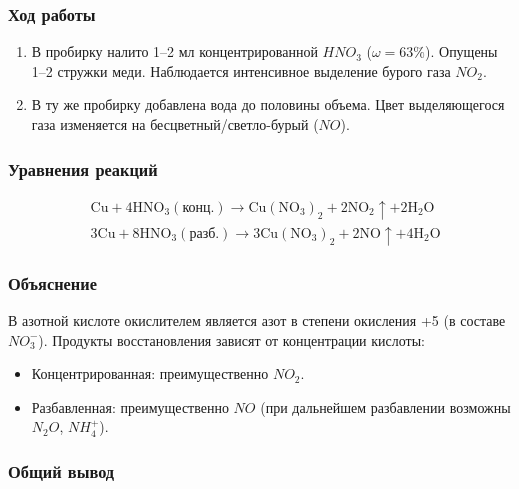 \documentclass[a4paper,12pt]{article}
\begin{document}
	\subsubsection*{Ход работы}
	\begin{enumerate}
		\item В пробирку налито 1–2 мл концентрированной \(HNO_3\) (\(\omega = 63\%\)). Опущены 1–2 стружки меди. Наблюдается интенсивное выделение бурого газа \(NO_2\).
		\item В ту же пробирку добавлена вода до половины объема. Цвет выделяющегося газа изменяется на бесцветный/светло-бурый (\(NO\)).
	\end{enumerate}
	
	\subsubsection*{Уравнения реакций}
	\begin{align*}
		& \text{Cu} + 4\text{HNO}_3 (\text{конц.}) \rightarrow \text{Cu}(\text{NO}_3)_2 + 2\text{NO}_2 \uparrow + 2\text{H}_2\text{O} \\
		& 3\text{Cu} + 8\text{HNO}_3 (\text{разб.}) \rightarrow 3\text{Cu}(\text{NO}_3)_2 + 2\text{NO} \uparrow + 4\text{H}_2\text{O}
	\end{align*}
	
	\subsubsection*{Объяснение}
	
	\quad В азотной кислоте окислителем является азот в степени окисления +5 (в составе \(NO_3^-\)). Продукты восстановления зависят от концентрации кислоты:
	\begin{itemize}
		\item Концентрированная: преимущественно \(NO_2\).
		\item Разбавленная: преимущественно \(NO\) (при дальнейшем разбавлении возможны \(N_2O\), \(NH_4^+\)).
	\end{itemize}
	
	\subsubsection*{Общий вывод}
	
\end{document}
